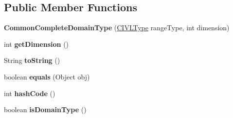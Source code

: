 \subsection*{Public Member Functions}
\begin{DoxyCompactItemize}
\item 
\hypertarget{classedu_1_1udel_1_1cis_1_1vsl_1_1civl_1_1model_1_1common_1_1type_1_1CommonCompleteDomainType_ad5b5151e3c8bc28560a40fa8abdfbfbe}{}{\bfseries Common\+Complete\+Domain\+Type} (\hyperlink{interfaceedu_1_1udel_1_1cis_1_1vsl_1_1civl_1_1model_1_1IF_1_1type_1_1CIVLType}{C\+I\+V\+L\+Type} range\+Type, int dimension)\label{classedu_1_1udel_1_1cis_1_1vsl_1_1civl_1_1model_1_1common_1_1type_1_1CommonCompleteDomainType_ad5b5151e3c8bc28560a40fa8abdfbfbe}

\item 
\hypertarget{classedu_1_1udel_1_1cis_1_1vsl_1_1civl_1_1model_1_1common_1_1type_1_1CommonCompleteDomainType_a0b5e11a8ad38dc8456357bc2be031b66}{}int {\bfseries get\+Dimension} ()\label{classedu_1_1udel_1_1cis_1_1vsl_1_1civl_1_1model_1_1common_1_1type_1_1CommonCompleteDomainType_a0b5e11a8ad38dc8456357bc2be031b66}

\item 
\hypertarget{classedu_1_1udel_1_1cis_1_1vsl_1_1civl_1_1model_1_1common_1_1type_1_1CommonCompleteDomainType_a14efb4867bc8f8a1725386a1fcf4f40c}{}String {\bfseries to\+String} ()\label{classedu_1_1udel_1_1cis_1_1vsl_1_1civl_1_1model_1_1common_1_1type_1_1CommonCompleteDomainType_a14efb4867bc8f8a1725386a1fcf4f40c}

\item 
\hypertarget{classedu_1_1udel_1_1cis_1_1vsl_1_1civl_1_1model_1_1common_1_1type_1_1CommonCompleteDomainType_a5ffc92b822a4afc9845aa40d6a2ebac5}{}boolean {\bfseries equals} (Object obj)\label{classedu_1_1udel_1_1cis_1_1vsl_1_1civl_1_1model_1_1common_1_1type_1_1CommonCompleteDomainType_a5ffc92b822a4afc9845aa40d6a2ebac5}

\item 
\hypertarget{classedu_1_1udel_1_1cis_1_1vsl_1_1civl_1_1model_1_1common_1_1type_1_1CommonCompleteDomainType_afe58fcec44e0aa82328d4ff068511850}{}int {\bfseries hash\+Code} ()\label{classedu_1_1udel_1_1cis_1_1vsl_1_1civl_1_1model_1_1common_1_1type_1_1CommonCompleteDomainType_afe58fcec44e0aa82328d4ff068511850}

\item 
\hypertarget{classedu_1_1udel_1_1cis_1_1vsl_1_1civl_1_1model_1_1common_1_1type_1_1CommonCompleteDomainType_a425a475950caf40429d9b81ce035f578}{}boolean {\bfseries is\+Domain\+Type} ()\label{classedu_1_1udel_1_1cis_1_1vsl_1_1civl_1_1model_1_1common_1_1type_1_1CommonCompleteDomainType_a425a475950caf40429d9b81ce035f578}

\end{DoxyCompactItemize}
